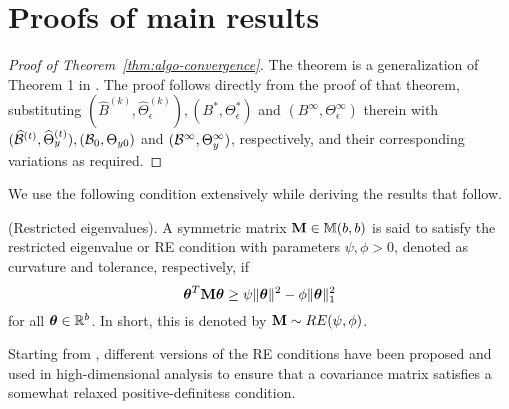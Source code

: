 \section{Proofs of main results}

\begin{proof}[Proof of Theorem~\ref{thm:algo-convergence}]
The theorem is a generalization of Theorem 1 in \cite{LinEtal16}. The proof follows directly from the proof of that theorem, substituting $( \widehat B^{(k)}, \widehat \Theta_\epsilon^{(k)}), (B^*, \Theta_\epsilon^*)$ and $ (B^\infty, \Theta_\epsilon^\infty)$ therein with $(\widehat {{\cal{B}}}^{(t)}, \widehat \Theta_y^{(t)}), ( {\cal{B}}_0, \Theta_{y 0})$ and $ ({\cal{B}}^\infty, \Theta_y^\infty)$, respectively, and their corresponding variations as required.

\end{proof}

We use the following condition extensively while deriving the results that follow.

\vspace{1em}
 (Restricted eigenvalues). A symmetric matrix ${\mathbf{M}} \in {\mathbb{M}}(b,b)$ is said to satisfy the restricted eigenvalue or RE condition with parameters $\psi, \phi >0$, denoted as curvature and tolerance, respectively, if
%
$$
{\boldsymbol{\theta}}^T {\mathbf{M}} {\boldsymbol{\theta}} \geq \psi \| {\boldsymbol{\theta}} \|^2 - \phi \| {\boldsymbol{\theta}} \|_1^2
$$
%
for all ${\boldsymbol{\theta}} \in {\mathbb{R}}^b$. In short, this is denoted by ${\mathbf{M}} \sim RE(\psi, \phi)$.

Starting from \cite{BickelRitovTsybakov09}, different versions of the RE conditions have been proposed and used in high-dimensional analysis \citep{LohWainwright12,BasuMichailidis15,MaMichailidis15,vandeGeerBuhlmann09} to ensure that a covariance matrix satisfies a somewhat relaxed positive-definitess condition.

